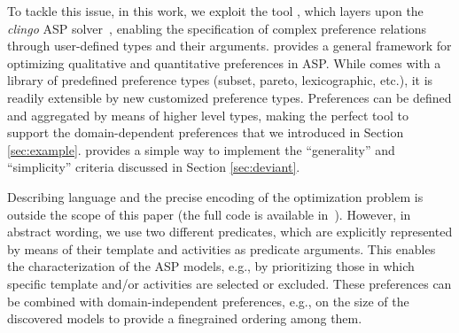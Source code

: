 To tackle this issue, in this work, we exploit the \asprin tool \cite{DBLP:conf/aaai/BrewkaD0S15}, which layers upon the \emph{clingo} \ac{ASP} solver~\cite{clingo}, enabling the specification of complex preference relations through user-defined  types and their arguments. 
%
%
\asprin provides a general framework for optimizing qualitative and quantitative preferences in \ac{ASP}. %
While \asprin comes with a library of predefined preference types (subset, pareto, lexicographic, etc.), it is readily extensible by new customized preference types. Preferences can be defined and aggregated by means of higher level types, making \asprin the perfect tool to support the domain-dependent preferences that we introduced in Section \ref{sec:example}.  %
\asprin provides a simple way to implement the ``generality'' and ``simplicity'' criteria discussed in Section \ref{sec:deviant}.



Describing  \asprin language and the precise encoding of the optimization problem is outside the scope of this paper (the full code is available in~\cite{zenodo:experiments}). However, in abstract wording, we use two different predicates,
which are explicitly represented by means of their template and activities as predicate arguments.
%
This enables the characterization of the \ac{ASP} models, e.g., by prioritizing those in which specific template and/or activities are selected or excluded. These preferences can be combined with domain-independent preferences, e.g., on the size of the discovered models to provide a fine\btext{-}grained ordering among them.
